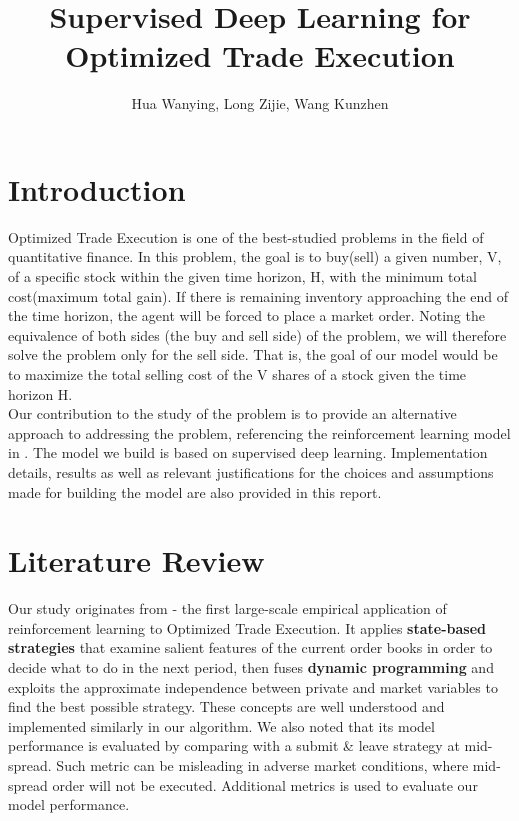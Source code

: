 \documentclass[12pt]{extarticle}
\title{Supervised Deep Learning for Optimized Trade Execution}
\author{Hua Wanying, Long Zijie, Wang Kunzhen}
\begin{document}
\maketitle

\section{Introduction}
Optimized Trade Execution is one of the best-studied problems in the field
of quantitative finance. In this problem, the goal is to buy(sell) a given
number, V, of a specific stock within the given time horizon, H, with the
minimum total cost(maximum total gain). If there is remaining inventory
approaching the end of the time horizon, the agent will be forced to place
a market order. Noting the equivalence of both sides (the buy and sell side) of the
problem, we will therefore solve the problem only for the sell side. That is,
the goal of our model would be to maximize the total selling cost of the
V shares of a stock given the time horizon H.\\


\noindent Our contribution to the study of the problem is to provide an alternative
approach to addressing the problem, referencing the reinforcement learning model in
\cite{reinforcement}. The model we build is based on supervised deep learning.
Implementation details, results as well as relevant justifications for the choices
and assumptions made for building the model are also provided in this report.

\section{Literature Review}

Our study originates from \cite{reinforcement} - the first large-scale empirical application of reinforcement learning to Optimized Trade Execution. It applies \textbf{state-based strategies} that examine salient features of the current order books in order to decide what to do in the next period, then fuses \textbf{dynamic programming} and exploits the approximate independence between private and market variables to find the best possible strategy. These concepts are well understood and implemented similarly in our algorithm. We also noted that its model performance is evaluated by comparing with a submit \& leave strategy at mid-spread. Such metric can be misleading in adverse market conditions, where mid-spread order will not be executed. Additional metrics is used to evaluate our model performance.
\end{document}
